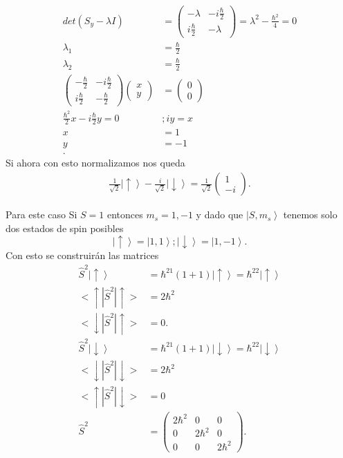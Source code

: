 \documentclass{report}
\begin{document}
\sol

\begin{align*}
	det(S_y - \lambda I)&=\begin{pmatrix} -\lambda & -i\frac{\hbar}{2}\\ i\frac{\hbar}{2} & -\lambda \end{pmatrix} = \lambda^2-\frac{\hbar^2}{4}=0\\
	\lambda_1 &= \frac{\hbar}{2} \\
	\lambda_2 &= \frac{\hbar}{2} \\
	\begin{pmatrix} -\frac{\hbar}{2} & -i\frac{\hbar}{2}\\ i\frac{\hbar}{2} & -\frac{\hbar}{2} \end{pmatrix}\begin{pmatrix} x \\ y \end{pmatrix} &= \begin{pmatrix} 0 \\ 0 \end{pmatrix}  \\
	\frac{\hbar^2}{2}x-i\frac{\hbar}{2}y = 0 &; iy = x\\
	x &= 1 \\
	y &= -1 \\
.\end{align*}
Si ahora con esto normalizamos nos queda
\begin{align*}
	\frac{1}{\sqrt{2} }\left| \uparrow \right> - \frac{i}{\sqrt{2} }\left| \downarrow \right> = \frac{1}{\sqrt{2} }\begin{pmatrix} 1\\-i \end{pmatrix} 
.\end{align*}


\sol

Para este caso Si $S=1$ entonces $m_s=1,-1$ y dado que  $\left| S, m_s \right>$ tenemos solo dos estados de spin posibles \[
\left| \uparrow \right> = \left| 1,1 \right> ; \left| \downarrow \right> = \left| 1,-1 \right>
.\] Con esto se construirán las matrices
\begin{align*}
	\hat{S}^2\left| \uparrow \right> &= \hbar^21(1+1)\left| \uparrow \right> = \hbar^22\left| \uparrow \right>\\
	<\uparrow|\hat{S}^2|\uparrow> &= 2\hbar^2\\
	<\downarrow|\hat{S}^2|\uparrow> &= 0
.\end{align*}
\begin{align*}
	\hat{S}^2\left| \downarrow \right> &= \hbar^21(1+1)\left| \downarrow \right> = \hbar^22\left| \downarrow \right>\\
	<\downarrow|\hat{S}^2|\downarrow> &= 2\hbar^2\\
	<\uparrow|\hat{S}^2|\downarrow> &= 0\\
	\hat{S}^2&=\begin{pmatrix} 2\hbar^2 & 0 & 0\\
	0 & 2\hbar^2 & 0\\
	0 & 0 & 2\hbar^2
\end{pmatrix} 
.\end{align*}
\end{document}
